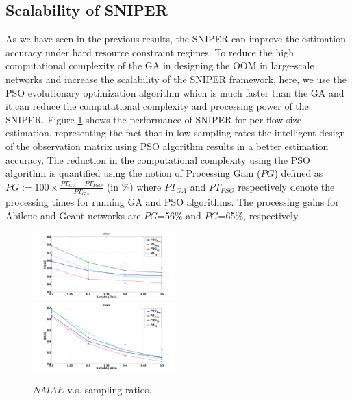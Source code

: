 \subsection{Scalability of SNIPER}
As we have seen in the previous results, the SNIPER can improve the estimation accuracy under hard resource constraint regimes. To reduce the high computational complexity of the GA in designing the OOM in large-scale networks and increase the scalability of the SNIPER framework, here, we use the PSO evolutionary optimization algorithm which is much faster than the GA \cite{Talib:2009}\cite{Kachitvichyanuku:2012} and it can reduce the computational complexity and processing power of the SNIPER. Figure \ref{fig:AbileneGeantPSOTMC} shows the performance of SNIPER for per-flow size estimation, representing the fact that in low sampling rates the intelligent design of the observation matrix using PSO algorithm results in a better estimation accuracy. The reduction in the computational complexity using the PSO algorithm is quantified using the notion of Processing Gain ($PG$) defined as $PG := 100 \times \frac{PT_{GA}-PT_{PSO}}{PT_{GA}}$ (in \%) where $PT_{GA}$ and $PT_{PSO}$ respectively denote the processing times for running GA and PSO algorithms. The processing gains for Abilene and Geant networks are $PG$=56\% and $PG$=65\%, respectively. 
\begin{figure}
  \begin{center}
    {\includegraphics[keepaspectratio, width=0.49\textwidth]{AbilenePSOTMC.png}} \\
    {\includegraphics[keepaspectratio, width=0.49\textwidth]{GeantPSOTMC.png}}
  \end{center}
  \caption{{{$NMAE$ v.s. sampling ratios.}}}
  \label{fig:AbileneGeantPSOTMC}
\end{figure}

